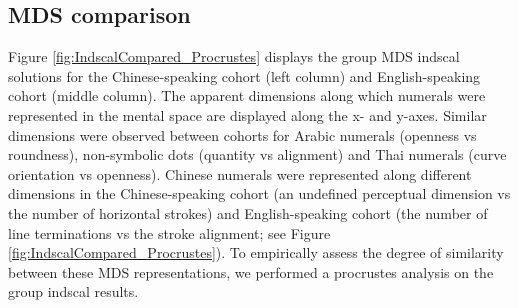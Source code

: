 \subsection{MDS comparison}
Figure \ref{fig:IndscalCompared_Procrustes} displays the group MDS indscal solutions for the Chinese-speaking cohort (left column) and English-speaking cohort (middle column). The apparent dimensions along which numerals were represented in the mental space are displayed along the x- and y-axes. Similar dimensions were observed between cohorts for Arabic numerals (openness vs roundness), non-symbolic dots (quantity vs alignment) and Thai numerals (curve orientation vs openness). Chinese numerals were represented along different dimensions in the Chinese-speaking cohort (an undefined perceptual dimension vs the number of horizontal strokes) and English-speaking cohort (the number of line terminations vs the stroke alignment; see Figure \ref{fig:IndscalCompared_Procrustes}). To empirically assess the degree of similarity between these MDS representations, we performed a procrustes analysis on the group indscal results.

